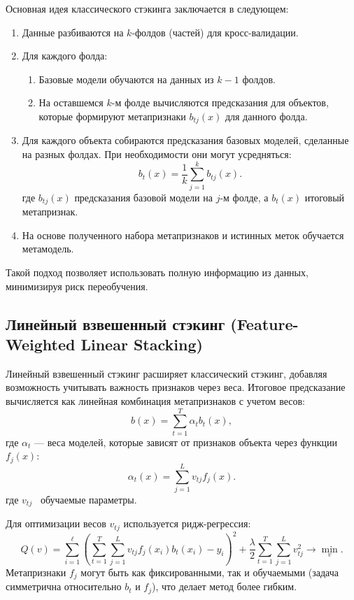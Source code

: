 Основная идея классического стэкинга заключается в следующем:
\begin{enumerate}
    \item Данные разбиваются на \( k \)-фолдов (частей) для кросс-валидации.
    \item Для каждого фолда:
    \begin{enumerate}
        \item Базовые модели обучаются на данных из \( k-1 \) фолдов.
        \item На оставшемся \( k \)-м фолде вычисляются предсказания для объектов, которые формируют метапризнаки \( b_{tj}(x) \) для данного фолда.
    \end{enumerate}
    \item Для каждого объекта собираются предсказания базовых моделей, сделанные на разных фолдах. При необходимости они могут усредняться:
    \[
    b_t(x) = \frac{1}{k} \sum_{j=1}^k b_{tj}(x).
    \]
     где \( b_{tj}(x) \) \textemdash предсказания базовой модели на \( j \)-м фолде, а \( b_t(x) \) \textemdash итоговый метапризнак.
    \item На основе полученного набора метапризнаков и истинных меток обучается метамодель.
\end{enumerate}

Такой подход позволяет использовать полную информацию из данных, минимизируя риск переобучения. 



\subsection*{Линейный взвешенный стэкинг (Feature-Weighted Linear Stacking)}

Линейный взвешенный стэкинг расширяет классический стэкинг, добавляя возможность учитывать важность признаков через веса. Итоговое предсказание вычисляется как линейная комбинация метапризнаков с учетом весов:
\[
    b(x) = \sum_{t=1}^T \alpha_t b_t(x),
\]
где \( \alpha_t \) — веса моделей, которые зависят от признаков объекта через функции \( f_j(x) \):
\[
    \alpha_t(x) = \sum_{j=1}^L v_{tj} f_j(x).
\]
где \( v_{tj} \) \textemdash~обучаемые параметры.


Для оптимизации весов \( v_{tj} \) используется ридж-регрессия:
\[
Q(v) = \sum_{i=1}^\ell \left( \sum_{t=1}^T \sum_{j=1}^L v_{tj} f_j(x_i) b_t(x_i) - y_i \right)^2 + \frac{\lambda}{2} \sum_{t=1}^T \sum_{j=1}^L v_{tj}^2 \to \min_v.
\]
Метапризнаки \( f_j \) могут быть как фиксированными, так и обучаемыми (задача симметрична относительно \( b_t \) и \( f_j \)), что делает метод более гибким.

